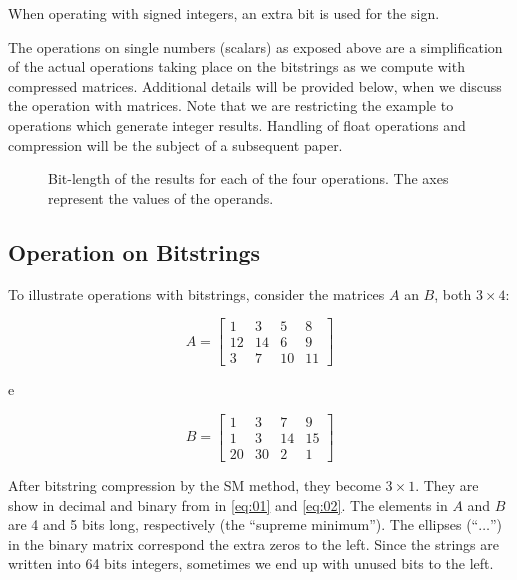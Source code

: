\documentclass[12pt]{article}
\begin{document}
When operating with signed integers, an extra bit is used for the sign.

The operations on single numbers (scalars) as exposed above are a simplification
of the
actual operations taking place on the bitstrings as we compute with compressed
matrices. Additional details will be provided below, when we discuss the
operation with matrices. Note that we are restricting the example to operations
which generate integer results. Handling of float operations and compression
will be the subject of a subsequent paper.

\begin{figure}[h]
 \centering
 \caption{Bit-length of the results for each of the four operations. The axes
represent the values of the operands.}
 \label{fig:bitlength}
\end{figure}


\subsection{Operation on Bitstrings}

To illustrate operations with bitstrings, consider the matrices $A$ an $B$,
both $3 \times 4$:



\begin{equation}
	A = \begin{bmatrix}
			1 & 3 & 5 & 8\\ 
			12 &14  & 6 & 9\\ 
			3 & 7 & 10 & 11
		\end{bmatrix}
\end{equation}

e

\begin{equation}
	B = \begin{bmatrix}
			1  & 3  & 7 & 9\\ 
			1  &3   & 14 & 15\\ 
			20 & 30 & 2 & 1
		\end{bmatrix}
\end{equation}

After bitstring compression by the SM method, they become $3 \times 1$. They
are show in decimal and binary from in \ref{eq:01} and
\ref{eq:02}. The elements in $A$ and $B$ are 4 and 5 bits long, respectively
(the ``supreme minimum''). The ellipses (``$\ldots$'') in the binary matrix
correspond the extra zeros to the left. Since the strings are written into 64
bits integers, sometimes we end up with unused bits to the left.
\end{document}
